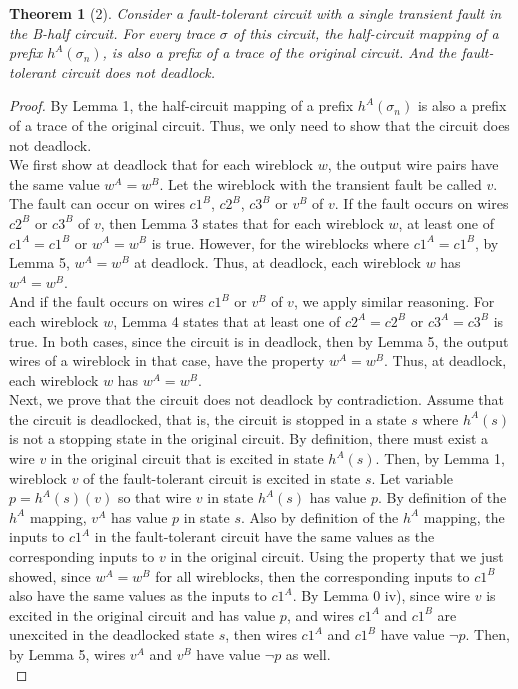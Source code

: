 \documentclass[12pt]{report}
\newtheorem*{theorem}{Theorem}
\begin{document}
\begin{theorem}[2]
Consider a fault-tolerant circuit with a single transient fault in the B-half circuit.  For every trace $\sigma$ of this circuit, the half-circuit mapping of a prefix $h^{A}(\sigma_n)$, is also a prefix of a trace of the original circuit.  And the fault-tolerant circuit does not deadlock.  
\end{theorem}
\begin{proof}
By Lemma 1, the half-circuit mapping of a prefix $h^{A}(\sigma_n)$ is also a prefix of a trace of the original circuit.  Thus, we only need to show that the circuit does not deadlock.\\

We first show at deadlock that for each wireblock $w$, the output wire pairs have the same value $w^A = w^B$.  Let the wireblock with the transient fault be called $v$. The fault can occur on wires $c1^B$, $c2^B$, $c3^B$ or $v^B$ of $v$.  If the fault occurs on wires $c2^B$ or $c3^B$ of $v$, then Lemma 3 states that for each wireblock $w$, at least one of $c1^A=c1^B$ or $w^A=w^B$ is true.  However, for the wireblocks where $c1^A=c1^B$, by Lemma 5, $w^A = w^B$ at deadlock.  Thus, at deadlock, each wireblock $w$ has $w^A = w^B$.\\

And if the fault occurs on wires $c1^B$ or $v^B$ of $v$, we apply similar reasoning.  For each wireblock $w$, Lemma 4 states that at least one of $c2^A=c2^B$ or $c3^A=c3^B$ is true.  In both cases, since the circuit is in deadlock, then by Lemma 5, the output wires of a wireblock in that case, have the property $w^A = w^B$.  Thus, at deadlock, each wireblock $w$ has $w^A = w^B$.\\%

Next, we prove that the circuit does not deadlock by contradiction.  Assume that the circuit is deadlocked, that is, the circuit is stopped in a state $s$ where $h^A(s)$ is not a stopping state in the original circuit.  By definition, there must exist a wire $v$ in the original circuit that is excited in state $h^A(s)$.   Then, by Lemma 1, wireblock $v$ of the fault-tolerant circuit is excited in state $s$.  
Let variable $p=h^A(s)(v)$ so that wire $v$ in state $h^A(s)$ has value $p$.  By definition of the $h^A$ mapping, $v^A$ has value $p$ in state $s$.  Also by definition of the $h^A$ mapping, the inputs to $c1^A$ in the fault-tolerant circuit have the same values as the corresponding inputs to $v$ in the original circuit.  Using the property that we just showed, since $w^A = w^B$ for all wireblocks, then the corresponding inputs to $c1^B$ also have the same values as the inputs to $c1^A$.  
By Lemma 0 iv), since wire $v$ is excited in the original circuit and has value $p$, and wires $c1^A$ and $c1^B$ are unexcited in the deadlocked state $s$, then wires $c1^A$ and $c1^B$ have value $\neg{p}$.  Then, by Lemma 5, wires $v^{A}$ and $v^B$ have value $\neg{p}$ as well.   \\


\end{proof}
\end{document}

